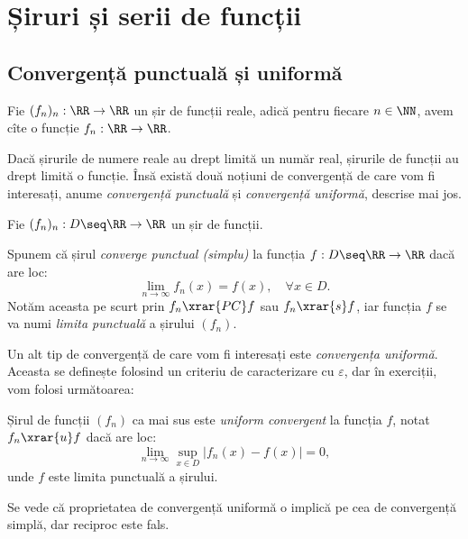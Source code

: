 
\chapter{Șiruri și serii de funcții}

\section{Convergență punctuală și uniformă}

Fie $ (f_n)_n : \RR \to \RR $ un șir de funcții reale, adică pentru
fiecare $ n \in \NN $, avem cîte o funcție $ f_n : \RR \to \RR $.

Dacă șirurile de numere reale au drept limită un număr real, șirurile
de funcții au drept limită o funcție. Însă există două noțiuni de
convergență de care vom fi interesați, anume \emph{convergență punctuală}
și \emph{convergență uniformă}, descrise mai jos.

\begin{definition}\label{def:conv-punc}
    Fie $ (f_n)_n : D \seq \RR \to \RR $ un șir de funcții.

    Spunem că șirul \emph{converge punctual (simplu)} la funcția
    $ f : D \seq \RR \to \RR $ dacă are loc:
    \[
        \lim_{n \to \infty} f_n(x) = f(x), \quad \forall x \in D.
    \]
    Notăm aceasta pe scurt prin $ f_n \xrar{PC} f $ sau $ f_n \xrar{s} f $,
    iar funcția $ f $ se va numi \emph{limita punctuală} a șirului $ (f_n) $.
\end{definition}

Un alt tip de convergență de care vom fi interesați este \emph{convergența %
uniformă}. Aceasta se definește folosind un criteriu de caracterizare cu $ \varepsilon $,
dar în exerciții, vom folosi următoarea:

\begin{theorem}\label{thm:conv-unif}
    Șirul de funcții $ (f_n) $ ca mai sus este \emph{uniform convergent} la funcția
    $ f $, notat $ f_n \xrar{u} f $ dacă are loc:
    \[
        \lim_{n \to \infty} \sup_{x \in D} |f_n(x) - f(x)| = 0,
    \]
    unde $ f $ este limita punctuală a șirului.
\end{theorem}

Se vede că proprietatea de convergență uniformă o implică pe cea de convergență
simplă, dar reciproc este fals.

